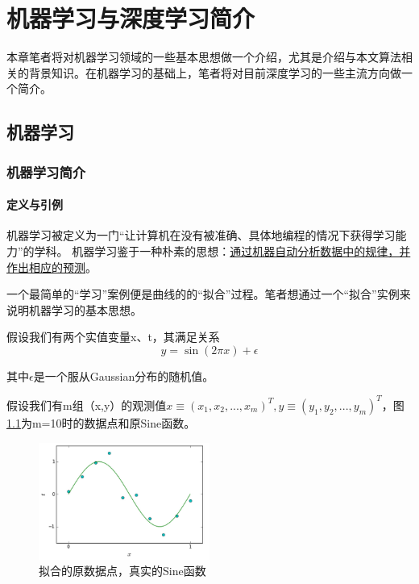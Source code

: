 \chapter{机器学习与深度学习简介}\label{chapter_machinelearning}
\graphicspath{{chapter2/figure/}}


本章笔者将对机器学习领域的一些基本思想做一个介绍，尤其是介绍与本文算法相关的背景知识。在机器学习的基础上，笔者将对目前深度学习的一些主流方向做一个简介。

\section{机器学习}

\subsection{机器学习简介}

\subsubsection{定义与引例}

机器学习被定义为一门“让计算机在没有被准确、具体地编程的情况下获得学习能力”的学科。
机器学习鉴于一种朴素的思想：\uline{通过机器自动分析数据中的规律，并作出相应的预测}。 

一个最简单的“学习”案例便是曲线的的“拟合”过程。笔者想通过一个“拟合”实例来说明机器学习的基本思想。

假设我们有两个实值变量x、t，其满足关系
\begin{equation}
\label{eqn:random}
y = \sin(2\pi x) + \epsilon
\end{equation}

其中$\epsilon$是一个服从Gaussian分布的随机值。

假设我们有m组（x,y）的观测值$x \equiv (x_1, x_2, ..., x_m)^T, y \equiv (y_1, y_2, ..., y_m)^T$，图\ref{fig:fitting}为m=10时的数据点和原Sine函数。

\begin{figure}[htbp]
   \centering
   \includegraphics[width=0.5\textwidth]{SineFitting.png} %
   \caption{拟合的原数据点，真实的Sine函数}
   \label{fig:fitting}
\end{figure}

